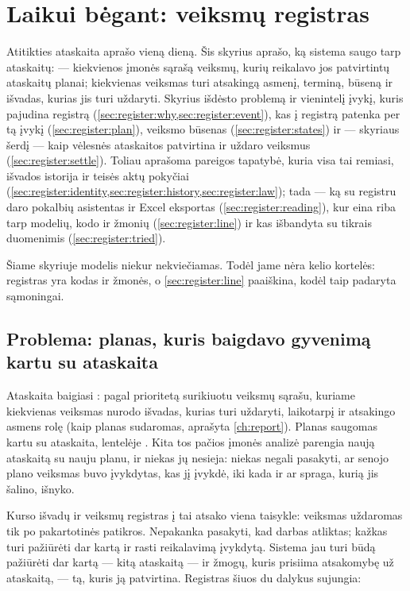 \chapter{Laikui bėgant: veiksmų registras}\label{ch:register}

Atitikties ataskaita aprašo vieną dieną. Šis skyrius aprašo, ką sistema saugo tarp ataskaitų:
 --- kiekvienos įmonės sąrašą veiksmų, kurių reikalavo jos patvirtintų
ataskaitų planai; kiekvienas veiksmas turi atsakingą asmenį, terminą, būseną ir išvadas, kurias
jis turi uždaryti. Skyrius išdėsto problemą ir vienintelį įvykį, kuris pajudina registrą
(\cref{sec:register:why,sec:register:event}), kas į registrą patenka per tą įvykį
(\cref{sec:register:plan}), veiksmo būsenas (\cref{sec:register:states}) ir --- skyriaus
šerdį --- kaip vėlesnės ataskaitos patvirtina ir uždaro veiksmus
(\cref{sec:register:settle}). Toliau aprašoma pareigos tapatybė, kuria visa tai remiasi,
išvados istorija ir teisės aktų pokyčiai
(\cref{sec:register:identity,sec:register:history,sec:register:law}); tada --- ką su registru
daro pokalbių asistentas ir Excel eksportas (\cref{sec:register:reading}), kur eina riba tarp
modelių, kodo ir žmonių (\cref{sec:register:line}) ir kas išbandyta su tikrais duomenimis
(\cref{sec:register:tried}).

Šiame skyriuje modelis niekur nekviečiamas. Todėl jame nėra kelio kortelės: registras yra kodas
ir žmonės, o \cref{sec:register:line} paaiškina, kodėl taip padaryta sąmoningai.


\section{Problema: planas, kuris baigdavo gyvenimą kartu su ataskaita}\label{sec:register:why}

Ataskaita baigiasi : pagal prioritetą surikiuotu veiksmų sąrašu, kuriame
kiekvienas veiksmas nurodo išvadas, kurias turi uždaryti, laikotarpį ir atsakingo asmens rolę
(kaip planas sudaromas, aprašyta \cref{ch:report}). Planas saugomas kartu su ataskaita, lentelėje
. Kita tos pačios įmonės analizė parengia naują ataskaitą su nauju planu, ir
niekas jų nesieja: niekas negali pasakyti, ar senojo plano veiksmas buvo įvykdytas, kas jį
įvykdė, iki kada ir ar spraga, kurią jis šalino, išnyko.

Kurso išvadų ir veiksmų registras į tai atsako viena taisykle: veiksmas uždaromas tik po
pakartotinės patikros. Nepakanka pasakyti, kad darbas atliktas; kažkas turi pažiūrėti dar kartą
ir rasti reikalavimą įvykdytą. Sistema jau turi būdą pažiūrėti dar kartą --- kitą ataskaitą ---
ir žmogų, kuris prisiima atsakomybę už ataskaitą, --- tą, kuris ją patvirtina. Registras šiuos
du dalykus sujungia:

